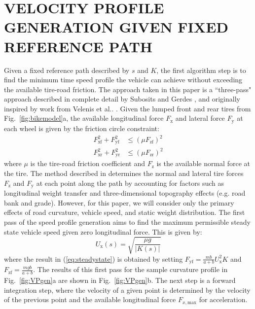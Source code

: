 \documentclass[twocolumn,10pt, final]{asme2e}
\begin{document}
\section*{VELOCITY PROFILE GENERATION GIVEN FIXED REFERENCE PATH}
Given a fixed reference path described by $s$ and $K$, the first algorithm step is to find the minimum time speed profile the vehicle can achieve
without exceeding the available tire-road friction. The approach taken in this paper is a ``three-pass" approach described in complete detail by 
Subosits and Gerdes \cite{subosits}, and originally inspired by work from Velenis et al.. \cite{velenis}. 
Given the lumped front and rear tires from Fig.~\ref{fig:bikemodel}a, the available longitudinal
force $F_\mathrm{x}$ and lateral force $F_\mathrm{y}$ at each wheel is given by the friction circle constraint: 
\begin{subequations}
\label{eq:tireforce}
\begin{align}
	F^2_\mathrm{xf} + F_\mathrm{yf}^2 &\leq (\mu F_\mathrm{zf})^2\\
	F^2_\mathrm{xr} + F_\mathrm{yr}^2 &\leq (\mu F_\mathrm{zr})^2
\end{align}
\end{subequations}
where $\mu$ is the tire-road friction coefficient and $F_\mathrm{z}$ is the available normal force at the tire. The method described in \cite{subosits} 
determines the normal and lateral tire forces $F_\mathrm{z}$ and $F_\mathrm{y}$ at each point along the path 
by accounting for factors such as longitudinal weight transfer and three-dimensional 
topography effects (e.g. road bank and grade). However, for this paper, we will consider only the primary
effects of road curvature, vehicle speed, and static weight distribution. The first pass of the speed profile generation aims to find the maximum permissible steady state vehicle speed given zero longitudinal force. This is given
by:
\begin{equation}
\label{eq:steadystate}
	U_\mathrm{x}(s) = \sqrt{\frac{\mu g}{|K(s)|}}
\end{equation}
where the result in (\ref{eq:steadystate}) is obtained by setting $F_\mathrm{yf} = \frac{mb}{a+b}U_\mathrm{x}^2K$ and $F_\mathrm{zf} = \frac{mgb}{a+b}$.
 The results of this first pass for the sample curvature profile in Fig.~\ref{fig:VPgen}a are shown in Fig.~\ref{fig:VPgen}b.
 The next step is a forward 
integration step, where the velocity of a given point is determined by the velocity of the previous point and the available longitudinal force $F_{x,\mathrm{max}}$ for acceleration.
\end{document}
